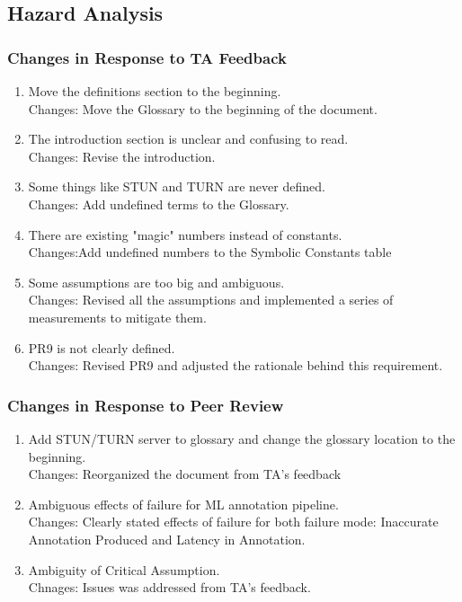 \documentclass{article}
\begin{document}
\subsection{Hazard Analysis}
\subsubsection{Changes in Response to TA Feedback}
\begin{enumerate}
        \item Move the definitions section to the beginning.\\
                Changes: Move the Glossary to the beginning of the document.
        \item The introduction section is unclear and confusing to read.\\
                Changes: Revise the introduction.
        \item Some things like STUN and TURN are never defined.\\
                Changes: Add undefined terms to the Glossary.
        \item There are existing "magic" numbers instead of constants.\\
                Changes:Add undefined numbers to the Symbolic Constants table
        \item Some assumptions are too big and ambiguous.\\
                Changes: Revised all the assumptions and implemented a series of measurements to mitigate them.
        \item PR9 is not clearly defined.\\
                Changes: Revised PR9 and adjusted the rationale behind this requirement.
\end{enumerate}
\subsubsection{Changes in Response to Peer Review}
\begin{enumerate}
        \item Add STUN/TURN server to glossary and change the glossary location to the beginning.\\
                Changes: Reorganized the document from TA's feedback
        \item Ambiguous effects of failure for ML annotation pipeline.\\
                Changes: Clearly stated effects of failure for both failure mode: Inaccurate Annotation Produced and Latency in
                Annotation.
        \item Ambiguity of Critical Assumption.\\
                Chnages: Issues was addressed from TA's feedback.        
\end{enumerate}
\end{document}
